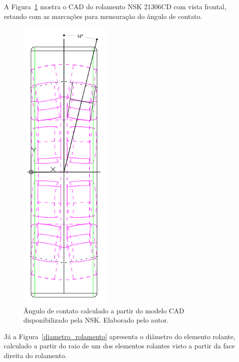 \documentclass[
	12pt,				
	oneside,			
	a4paper,			
	english,			
	brazil,			
	]{abntex2ppgsi}
\begin{document}
A Figura~\ref{angulo_de_contato} mostra o CAD do rolamento NSK 21306CD com vista frontal, estando com as marcações para mensuração do ângulo de contato. 

\begin{figure}[H]
\centering
\includegraphics[width=\textwidth,height=150mm,keepaspectratio]{angulo_de_contato}
\caption {Ângulo de contato calculado a partir do modelo CAD disponibilizado pela NSK. Elaborado pelo autor.}
\label{angulo_de_contato}
\end{figure} 

Já a Figura~\ref{diametro_rolamento} apresenta o diâmetro do elemento rolante, calculado a partir do raio de um dos elementos rolantes visto a partir da face direita do rolamento. 
\end{document}
